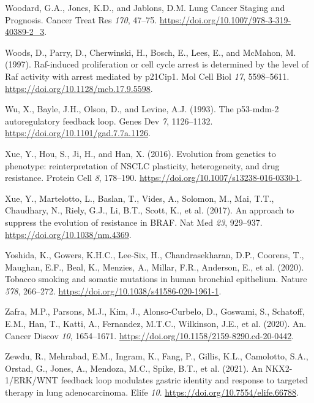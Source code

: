 \begin{CSLReferences}{0}{0}
\leavevmode{}%
Woodard, G.A., Jones, K.D., and Jablons, D.M. Lung Cancer Staging and Prognosis. Cancer Treat Res \emph{170}, 47--75. \url{https://doi.org/10.1007/978-3-319-40389-2_3}.

\leavevmode{}%
Woods, D., Parry, D., Cherwinski, H., Bosch, E., Lees, E., and McMahon, M. (1997). Raf-induced proliferation or cell cycle arrest is determined by the level of Raf activity with arrest mediated by p21Cip1. Mol Cell Biol \emph{17}, 5598--5611. \url{https://doi.org/10.1128/mcb.17.9.5598}.

\leavevmode{}%
Wu, X., Bayle, J.H., Olson, D., and Levine, A.J. (1993). The p53-mdm-2 autoregulatory feedback loop. Genes Dev \emph{7}, 1126--1132. \url{https://doi.org/10.1101/gad.7.7a.1126}.

\leavevmode{}%
Xue, Y., Hou, S., Ji, H., and Han, X. (2016). Evolution from genetics to phenotype: reinterpretation of NSCLC plasticity, heterogeneity, and drug resistance. Protein Cell \emph{8}, 178--190. \url{https://doi.org/10.1007/s13238-016-0330-1}.

\leavevmode{}%
Xue, Y., Martelotto, L., Baslan, T., Vides, A., Solomon, M., Mai, T.T., Chaudhary, N., Riely, G.J., Li, B.T., Scott, K., et al. (2017). An approach to suppress the evolution of resistance in BRAF. Nat Med \emph{23}, 929--937. \url{https://doi.org/10.1038/nm.4369}.

\leavevmode{}%
Yoshida, K., Gowers, K.H.C., Lee-Six, H., Chandrasekharan, D.P., Coorens, T., Maughan, E.F., Beal, K., Menzies, A., Millar, F.R., Anderson, E., et al. (2020). Tobacco smoking and somatic mutations in human bronchial epithelium. Nature \emph{578}, 266--272. \url{https://doi.org/10.1038/s41586-020-1961-1}.

\leavevmode{}%
Zafra, M.P., Parsons, M.J., Kim, J., Alonso-Curbelo, D., Goswami, S., Schatoff, E.M., Han, T., Katti, A., Fernandez, M.T.C., Wilkinson, J.E., et al. (2020). An. Cancer Discov \emph{10}, 1654--1671. \url{https://doi.org/10.1158/2159-8290.cd-20-0442}.

\leavevmode{}%
Zewdu, R., Mehrabad, E.M., Ingram, K., Fang, P., Gillis, K.L., Camolotto, S.A., Orstad, G., Jones, A., Mendoza, M.C., Spike, B.T., et al. (2021). An NKX2-1/ERK/WNT feedback loop modulates gastric identity and response to targeted therapy in lung adenocarcinoma. Elife \emph{10}. \url{https://doi.org/10.7554/elife.66788}.


\end{CSLReferences}
